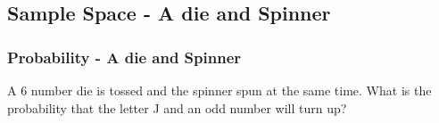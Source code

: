    	      	       \subsection[]{Sample Space - A die and Spinner}
   	      	       
   	      	         \begin{frame}   	      	       
   	      	           \frametitle{Probability - A die and Spinner}
   	      	           
   	      	           A 6 number die is tossed and the spinner spun at the same time. What is the probability that the letter J and an odd number will turn up?
   	      	           
   	      	           \begin{columns}[b]
   	      	           \end{columns}
   	      	        \end{frame}
   	      	        
